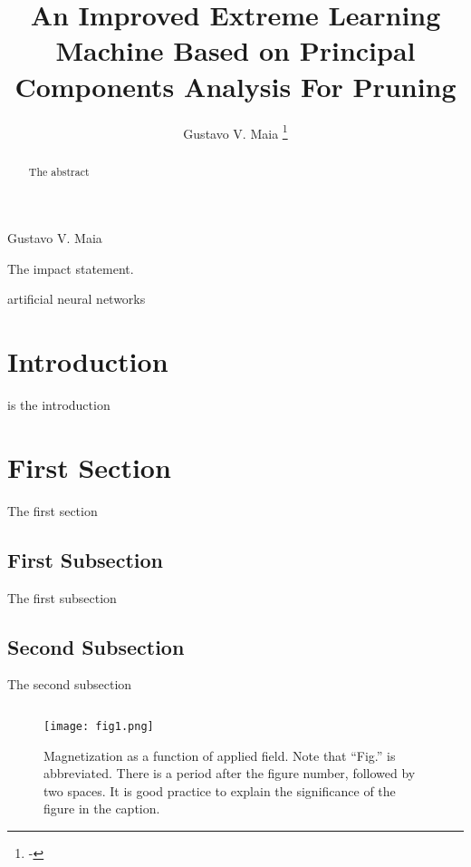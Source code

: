 \documentclass[journal]{IEEEtai}
\begin{document}
\title{An Improved Extreme Learning Machine Based on Principal Components Analysis For Pruning}


\author{Gustavo V. Maia
\thanks{-}}

{Gustavo V. Maia}

\maketitle

\begin{abstract}
    The abstract
\end{abstract}

\begin{IEEEImpStatement}
    The impact statement.
\end{IEEEImpStatement}

\begin{IEEEkeywords}
artificial neural networks
\end{IEEEkeywords}

\section{Introduction}\label{sec:introduction}

 is the introduction

\section{First Section}

The first section

\subsection{First Subsection}

The first subsection

\subsection{Second Subsection}

The second subsection

\begin{equation}
\label{eq:equation}
    \!
\end{equation}

\begin{figure}
\centerline{\texttt{[image: fig1.png]}}
\caption{Magnetization as a function of applied field. Note that ``Fig.'' is abbreviated. There is a period after the figure number, followed by two spaces. It is good practice to explain the significance of the figure in the caption.}
\label{fig:figure}
\end{figure}
\end{document}
